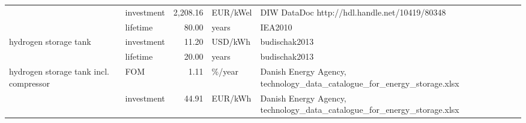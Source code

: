 \begin{longtable}{p{5cm}p{3cm}rp{3cm}p{11cm}}
                      & investment &       2,208.16 &                          EUR/kWel &                                                                                                                                                                                                                                                                                        DIW DataDoc http://hdl.handle.net/10419/80348 \\
                      & lifetime &          80.00 &                             years &                                                                                                                                                                                                                                                                                                                              IEA2010 \\
hydrogen storage tank & investment &          11.20 &                           USD/kWh &                                                                                                                                                                                                                                                                                                                        budischak2013 \\
                      & lifetime &          20.00 &                             years &                                                                                                                                                                                                                                                                                                                        budischak2013 \\
hydrogen storage tank incl. compressor & FOM &           1.11 &                            \%/year &                                                                                                                                                                                                                                                              Danish Energy Agency, technology\_data\_catalogue\_for\_energy\_storage.xlsx \\
                      & investment &          44.91 &                           EUR/kWh &                                                                                                                                                                                                                                                              Danish Energy Agency, technology\_data\_catalogue\_for\_energy\_storage.xlsx \\

\end{longtable}
